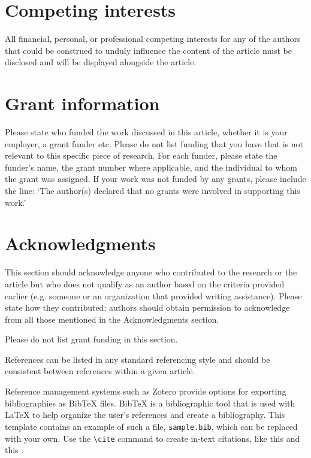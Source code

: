 \documentclass[9pt,a4paper]{extarticle}
\begin{document}
\section*{Competing interests}
All financial, personal, or professional competing interests for any of the authors that
could be construed to unduly influence the content of the article must be disclosed and will be displayed alongside the article. 

\section*{Grant information}
Please state who funded the work discussed in this article, whether it is your employer, a grant funder etc. Please do not list funding that you have that is not relevant to this
specific piece of research. For each funder, please state the funder’s name, the grant
number where applicable, and the individual to whom the grant was assigned.
If your work was not funded by any grants, please include the line: ‘The author(s)
declared that no grants were involved in supporting this work.’

\section*{Acknowledgments}
This section should acknowledge anyone who contributed to the research or the
article but who does not qualify as an author based on the criteria provided earlier
(e.g. someone or an organization that provided writing assistance). Please state how
they contributed; authors should obtain permission to acknowledge from all those
mentioned in the Acknowledgments section.

Please do not list grant funding in this section.


{\small
}

\bigskip
References can be listed in any standard referencing style and should be consistent between references within a given article.

Reference management systems such as Zotero provide options for exporting bibliographies as Bib\TeX{} files. Bib\TeX{} is a bibliographic tool that is used with \LaTeX{} to help organize the user's references and create a bibliography. This template contains an example of such a file, \texttt{sample.bib}, which can be replaced with your own. Use the \verb|\cite| command  to create in-text citations, like this \cite{Smith:2012qr} and this \cite{Smith:2013jd}.
\end{document}
